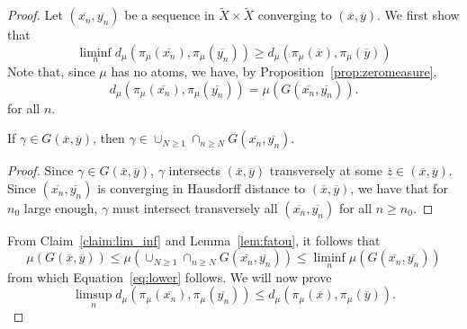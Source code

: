 \documentclass[10pt,a4paper]{amsart}
\newcommand*{\wt}[1]{\widetilde{#1}}
\begin{document}
\begin{proof}
Let $\left( \overline{x_n}, \overline{y_n} \right)$ be a sequence in $\wt{X} \times \wt{X}$ converging to $(\overline{x}, \overline{y})$.
We first show that
\begin{equation} \liminf_n d_{\mu}(\pi_{\mu}(\overline{x_n}), \pi_{\mu}(\overline{y_n})) \geq d_{\mu}(\pi_{\mu}(\overline{x}), \pi_{\mu}(\overline{y}))
\label{eq:lower}
\end{equation}
Note that, since $\mu$ has no atoms, we have, by Proposition~\ref{prop:zeromeasure},
\[
d_{\mu}(\pi_{\mu}(\overline{x_n}), \pi_{\mu}(\overline{y_n})) = \mu(G(\overline{x_n},\overline{y_n})).
\]
for all $n$.
\begin{claim}
If $\gamma \in G(\overline{x},\overline{y})$, then $\gamma \in \cup_{N \geq 1} \cap_{n \geq N} G(\overline{x_n},\overline{y_n})$.
\label{claim:lim_inf}
\end{claim}
\begin{proof}
Since $\gamma \in G(\overline{x},\overline{y})$, $\gamma$ intersects $(\overline{x},\overline{y})$ transversely at some $\overline{z} \in (\overline{x},\overline{y})$. Since
$(\overline{x_n},\overline{y_n})$ is converging in Hausdorff distance to $(\overline{x},\overline{y})$, we have that for $n_0$ large enough, $\gamma$ must intersect transversely all $(\overline{x_n},\overline{y_n})$ for all $n \geq n_0$.
\end{proof}
From Claim~\ref{claim:lim_inf} and Lemma~\ref{lem:fatou}, it follows that 
\[
\mu(G(\overline{x},\overline{y})) \leq \mu \left( \cup_{N \geq 1} \cap_{n \geq N} G(\overline{x_n},\overline{y_n})\right) \leq \liminf_n \mu(G(\overline{x_n},\overline{y_n}))
\]
from which Equation~\ref{eq:lower} follows.
We will now prove 
\begin{equation} \limsup_n d_{\mu}(\pi_{\mu}(\overline{x_n}), \pi_{\mu}(\overline{y_n})) \leq d_{\mu}(\pi_{\mu}(\overline{x}), \pi_{\mu}(\overline{y})).
\label{eq:upper}
\end{equation}





\end{proof}
\end{document}
